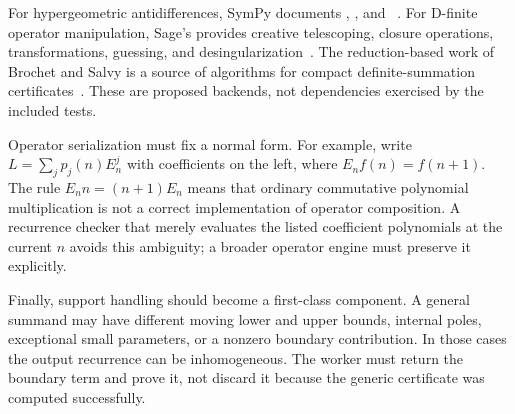 For hypergeometric antidifferences, SymPy documents ,
, and ~\cite{sympy-concrete}. For D-finite
operator manipulation, Sage's  provides creative telescoping,
closure operations, transformations, guessing, and desingularization~\cite{ore}.
The reduction-based work of Brochet and Salvy is a source of algorithms for
compact definite-summation certificates~\cite{brochet}. These are proposed
backends, not dependencies exercised by the included tests.

Operator serialization must fix a normal form. For example, write
$L=\sum_jp_j(n)E_n^j$ with coefficients on the left, where
$E_nf(n)=f(n+1)$. The rule $E_n n=(n+1)E_n$ means that ordinary commutative
polynomial multiplication is not a correct implementation of operator
composition. A recurrence checker that merely evaluates the listed coefficient
polynomials at the current $n$ avoids this ambiguity; a broader operator engine
must preserve it explicitly.

Finally, support handling should become a first-class component. A general
summand may have different moving lower and upper bounds, internal poles,
exceptional small parameters, or a nonzero boundary contribution. In those
cases the output recurrence can be inhomogeneous. The worker must return the
boundary term and prove it, not discard it because the generic certificate was
computed successfully.
